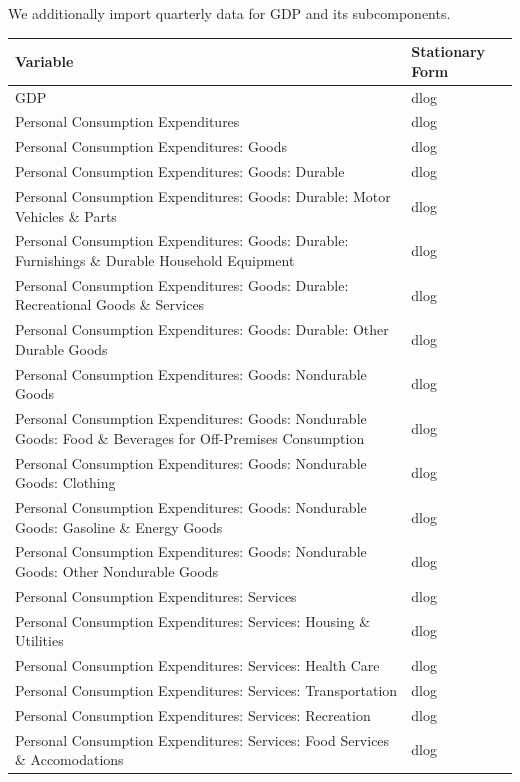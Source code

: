 \documentclass[11pt, letterpaper]{article}\usepackage[]{graphicx}\usepackage[]{color}
\begin{document}
We additionally import quarterly data for GDP and its subcomponents.
\begin{table}[!h]
\centering
\begingroup\scriptsize
\begin{tabular}{ll}
  \hline
Variable & Stationary Form \\ 
  \hline
GDP & dlog \\ 
  Personal Consumption Expenditures & dlog \\ 
  Personal Consumption Expenditures: Goods & dlog \\ 
  Personal Consumption Expenditures: Goods: Durable & dlog \\ 
  Personal Consumption Expenditures: Goods: Durable: Motor Vehicles \& Parts & dlog \\ 
  Personal Consumption Expenditures: Goods: Durable: Furnishings \& Durable Household Equipment & dlog \\ 
  Personal Consumption Expenditures: Goods: Durable: Recreational Goods \& Services & dlog \\ 
  Personal Consumption Expenditures: Goods: Durable: Other Durable Goods & dlog \\ 
  Personal Consumption Expenditures: Goods: Nondurable Goods & dlog \\ 
  Personal Consumption Expenditures: Goods: Nondurable Goods: Food \& Beverages for Off-Premises Consumption & dlog \\ 
  Personal Consumption Expenditures: Goods: Nondurable Goods: Clothing & dlog \\ 
  Personal Consumption Expenditures: Goods: Nondurable Goods: Gasoline \& Energy Goods & dlog \\ 
  Personal Consumption Expenditures: Goods: Nondurable Goods: Other Nondurable Goods & dlog \\ 
  Personal Consumption Expenditures: Services & dlog \\ 
  Personal Consumption Expenditures: Services: Housing \& Utilities & dlog \\ 
  Personal Consumption Expenditures: Services: Health Care & dlog \\ 
  Personal Consumption Expenditures: Services: Transportation & dlog \\ 
  Personal Consumption Expenditures: Services: Recreation & dlog \\ 
  Personal Consumption Expenditures: Services: Food Services \& Accomodations & dlog \\ 

\end{tabular}
\end{table}
\end{document}
